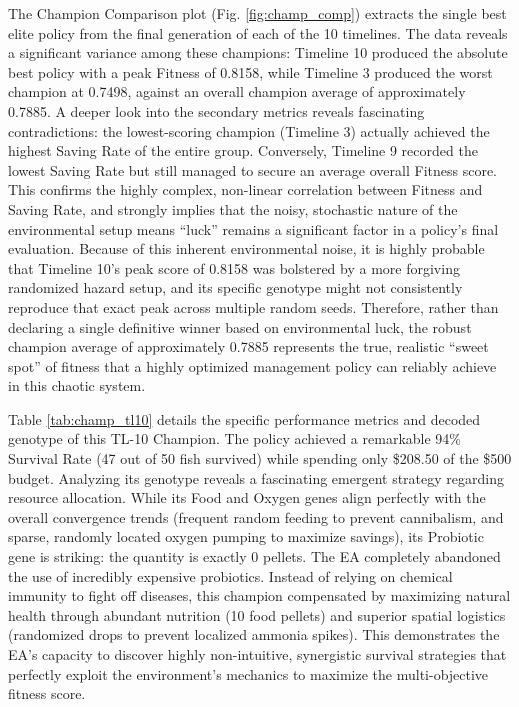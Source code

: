 \documentclass[conference]{IEEEtran}
\begin{document}
The Champion Comparison plot (Fig. \ref{fig:champ_comp}) extracts the single best elite policy from the final generation of each of the 10 timelines. The data reveals a significant variance among these champions: Timeline 10 produced the absolute best policy with a peak Fitness of 0.8158, while Timeline 3 produced the worst champion at 0.7498, against an overall champion average of approximately 0.7885. A deeper look into the secondary metrics reveals fascinating contradictions: the lowest-scoring champion (Timeline 3) actually achieved the highest Saving Rate of the entire group. Conversely, Timeline 9 recorded the lowest Saving Rate but still managed to secure an average overall Fitness score. This confirms the highly complex, non-linear correlation between Fitness and Saving Rate, and strongly implies that the noisy, stochastic nature of the environmental setup means ``luck'' remains a significant factor in a policy's final evaluation. Because of this inherent environmental noise, it is highly probable that Timeline 10's peak score of 0.8158 was bolstered by a more forgiving randomized hazard setup, and its specific genotype might not consistently reproduce that exact peak across multiple random seeds. Therefore, rather than declaring a single definitive winner based on environmental luck, the robust champion average of approximately 0.7885 represents the true, realistic ``sweet spot'' of fitness that a highly optimized management policy can reliably achieve in this chaotic system.

Table \ref{tab:champ_tl10} details the specific performance metrics and decoded genotype of this TL-10 Champion. The policy achieved a remarkable 94\% Survival Rate (47 out of 50 fish survived) while spending only \$208.50 of the \$500 budget. Analyzing its genotype reveals a fascinating emergent strategy regarding resource allocation. While its Food and Oxygen genes align perfectly with the overall convergence trends (frequent random feeding to prevent cannibalism, and sparse, randomly located oxygen pumping to maximize savings), its Probiotic gene is striking: the quantity is exactly 0 pellets. The EA completely abandoned the use of incredibly expensive probiotics. Instead of relying on chemical immunity to fight off diseases, this champion compensated by maximizing natural health through abundant nutrition (10 food pellets) and superior spatial logistics (randomized drops to prevent localized ammonia spikes). This demonstrates the EA's capacity to discover highly non-intuitive, synergistic survival strategies that perfectly exploit the environment's mechanics to maximize the multi-objective fitness score.
\end{document}
